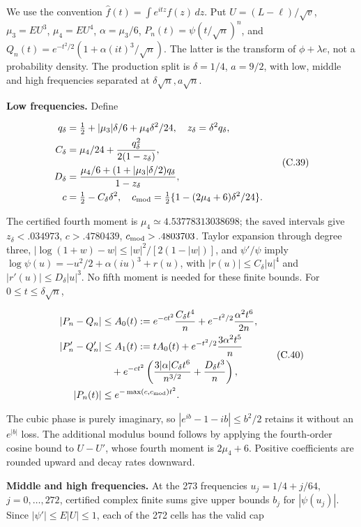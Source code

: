 \documentclass{article}
\begin{document}
We use the convention \(\widehat f(t)=\int e^{itz}f(z)\,dz\). Put
\(U=(L-\ell)/\sqrt v\), \(\mu_3=EU^3\), \(\mu_4=EU^4\),
\(\alpha=\mu_3/6\), \(P_n(t)=\psi(t/\sqrt n)^n\), and
\(Q_n(t)=e^{-t^2/2}(1+\alpha(it)^3/\sqrt n)\). The latter is the
transform of \(\phi+\lambda e\), not a probability density. The
production split is \(\delta=1/4\), \(a=9/2\), with low, middle and high
frequencies separated at \(\delta\sqrt n,a\sqrt n\).

\textbf{Low frequencies.} Define

\[
\begin{aligned}
q_\delta&=\tfrac12+|\mu_3|\delta/6+\mu_4\delta^2/24,
\quad z_\delta=\delta^2q_\delta,\\
C_\delta&=\mu_4/24+\frac{q_\delta^2}{2(1-z_\delta)},\\
D_\delta&=\frac{\mu_4/6+(1+|\mu_3|\delta/2)q_\delta}{1-z_\delta},\\
c&=\tfrac12-C_\delta\delta^2,\quad
c_{\rm mod}=\tfrac12\{1-(2\mu_4+6)\delta^2/24\}.
\end{aligned}
\tag{C.39}
\]

The certified fourth moment is \(\mu_4\simeq4.53778313038698\); the
saved intervals give \(z_\delta<.034973\), \(c>.4780439\),
\(c_{\rm mod}>.4803703\). Taylor expansion through degree three,
\(|\log(1+w)-w|\le |w|^2/[2(1-|w|)]\), and \(\psi'/\psi\) imply
\(\log\psi(u)=-u^2/2+\alpha(iu)^3+r(u)\), with
\(|r(u)|\le C_\delta|u|^4\) and \(|r'(u)|\le D_\delta|u|^3\). No fifth
moment is needed for these finite bounds. For
\(0\le t\le\delta\sqrt n\),

\[
\begin{aligned}
|P_n-Q_n|&\le A_0(t):=e^{-ct^2}\frac{C_\delta t^4}{n}
+e^{-t^2/2}\frac{\alpha^2t^6}{2n},\\
|P_n'-Q_n'|&\le A_1(t):=tA_0(t)+e^{-t^2/2}\frac{3\alpha^2t^5}{n}\\
&\quad+e^{-ct^2}\left(\frac{3|\alpha|C_\delta t^6}{n^{3/2}}
+\frac{D_\delta t^3}{n}\right),\\
|P_n(t)|&\le e^{-\max(c,c_{\rm mod})t^2}.
\end{aligned}
\tag{C.40}
\]

The cubic phase is purely imaginary, so \(|e^{ib}-1-ib|\le b^2/2\)
retains it without an \(e^{|b|}\) loss. The additional modulus bound
follows by applying the fourth-order cosine bound to \(U-U'\), whose
fourth moment is \(2\mu_4+6\). Positive coefficients are rounded upward
and decay rates downward.

\textbf{Middle and high frequencies.} At the 273 frequencies
\(u_j=1/4+j/64\), \(j=0,\ldots,272\), certified complex finite sums give
upper bounds \(b_j\) for \(|\psi(u_j)|\). Since \(|\psi'|\le E|U|\le1\),
each of the 272 cells has the valid cap
\end{document}
